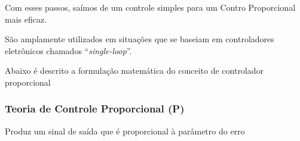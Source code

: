 \documentclass[portugues, brazil, a4paper,12pt]{article}
\begin{document}
		Com esses passos, saímos de um controle simples para um Contro Proporcional mais eficaz.

		São amplamente utilizados em situações que se baseiam em controladores eletrônicos chamados ``\textit{single-loop}''.

		Abaixo é descrito a formulação matemática do conceito de controlador proporcional



	\subsubsection{Teoria de Controle Proporcional (P)} \label{sec:P}
		Produz um sinal de saída que é proporcional à parâmetro do erro
\end{document}
